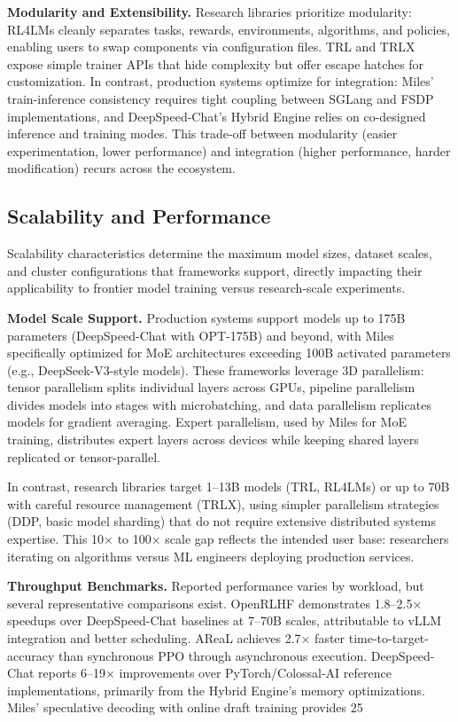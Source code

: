 \documentclass[conference]{IEEEtran}
\begin{document}
\textbf{Modularity and Extensibility.} Research libraries prioritize modularity: RL4LMs cleanly separates tasks, rewards, environments, algorithms, and policies, enabling users to swap components via configuration files. TRL and TRLX expose simple trainer APIs that hide complexity but offer escape hatches for customization. In contrast, production systems optimize for integration: Miles' train-inference consistency requires tight coupling between SGLang and FSDP implementations, and DeepSpeed-Chat's Hybrid Engine relies on co-designed inference and training modes. This trade-off between modularity (easier experimentation, lower performance) and integration (higher performance, harder modification) recurs across the ecosystem.

\subsection{Scalability and Performance}

Scalability characteristics determine the maximum model sizes, dataset scales, and cluster configurations that frameworks support, directly impacting their applicability to frontier model training versus research-scale experiments.

\textbf{Model Scale Support.} Production systems support models up to 175B parameters (DeepSpeed-Chat with OPT-175B) and beyond, with Miles specifically optimized for MoE architectures exceeding 100B activated parameters (e.g., DeepSeek-V3-style models). These frameworks leverage 3D parallelism: tensor parallelism splits individual layers across GPUs, pipeline parallelism divides models into stages with microbatching, and data parallelism replicates models for gradient averaging. Expert parallelism, used by Miles for MoE training, distributes expert layers across devices while keeping shared layers replicated or tensor-parallel.

In contrast, research libraries target 1–13B models (TRL, RL4LMs) or up to 70B with careful resource management (TRLX), using simpler parallelism strategies (DDP, basic model sharding) that do not require extensive distributed systems expertise. This 10× to 100× scale gap reflects the intended user base: researchers iterating on algorithms versus ML engineers deploying production services.

\textbf{Throughput Benchmarks.} Reported performance varies by workload, but several representative comparisons exist. OpenRLHF demonstrates 1.8–2.5× speedups over DeepSpeed-Chat baselines at 7–70B scales, attributable to vLLM integration and better scheduling. AReaL achieves 2.7× faster time-to-target-accuracy than synchronous PPO through asynchronous execution. DeepSpeed-Chat reports 6–19× improvements over PyTorch/Colossal-AI reference implementations, primarily from the Hybrid Engine's memory optimizations. Miles' speculative decoding with online draft training provides 25%
\end{document}
